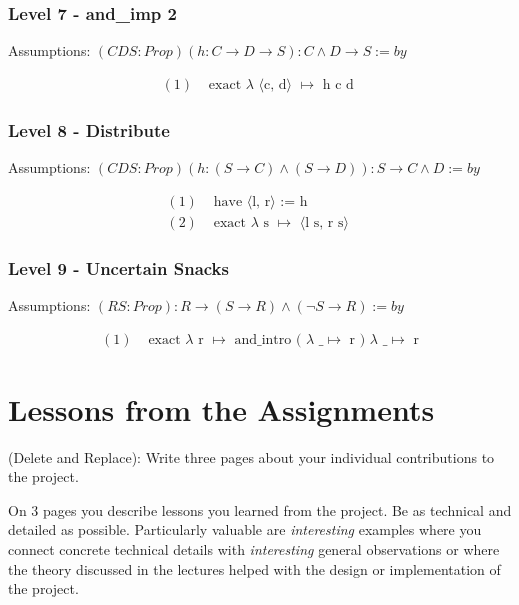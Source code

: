 \documentclass{article}
\theoremstyle{theorem}
\theoremstyle{definition}
\theoremstyle{remark}
\begin{document}
\subsubsection*{Level 7 - and\_imp 2}
Assumptions: $(C D S: Prop) (h : C \rightarrow D \rightarrow S) : C \wedge D \rightarrow S := by$

\[
\begin{aligned}
  (1)& \text{ exact } \lambda \text{ ⟨c, d⟩ } \mapsto \text{ h c d }
\end{aligned}
\]

\subsubsection*{Level 8 - Distribute}
Assumptions: $(C D S : Prop) (h : (S \rightarrow C) \wedge (S \rightarrow D)) : S \rightarrow C \wedge D := by$

\[
\begin{aligned}
  (1)& \text{ have ⟨l, r⟩ := h}\\
  (2)& \text{ exact } \lambda \text{ s } \mapsto \text{ ⟨l s, r s⟩ }
\end{aligned}
\]

\subsubsection*{Level 9 - Uncertain Snacks}
Assumptions: $(R S : Prop) : R \rightarrow (S \rightarrow R) \wedge (\neg S \rightarrow R) := by$

\[
\begin{aligned}
  (1)& \text{ exact } \lambda \text{ r } \mapsto \text{ and\_intro ( } \lambda \text{ \_ } \mapsto \text{ r ) } \lambda \text{ \_ } \mapsto \text{ r}
\end{aligned}
\]

\section{Lessons from the Assignments}

(Delete and Replace): Write three pages about your individual contributions to the project.

On 3 pages you describe lessons you learned from the project. Be as technical and detailed as possible. Particularly valuable are \emph{interesting} examples where you connect concrete technical details with \emph{interesting} general observations or where the theory discussed in the lectures helped with the design or implementation of the project.
\end{document}
